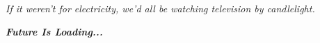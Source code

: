 \documentclass[12pt, french]{article}
\begin{document}























\begin{center}
	\emph{If it weren't for electricity, we'd all be watching television by candlelight.}

	\emph{\textbf{Future Is Loading...}}

\end{center}
\end{document}
